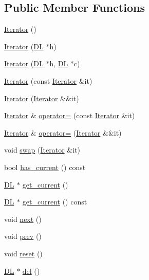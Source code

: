 \subsection*{Public Member Functions}
\begin{DoxyCompactItemize}
\item 
\hyperlink{class_designar_1_1_d_l_1_1_iterator_ac8115296dde1a00604510beba6707b36}{Iterator} ()
\item 
\hyperlink{class_designar_1_1_d_l_1_1_iterator_ab40eab4206926dca72f7981c4920c984}{Iterator} (\hyperlink{class_designar_1_1_d_l}{DL} $\ast$h)
\item 
\hyperlink{class_designar_1_1_d_l_1_1_iterator_aa90c0222a2141efc64f6b70b83137531}{Iterator} (\hyperlink{class_designar_1_1_d_l}{DL} $\ast$h, \hyperlink{class_designar_1_1_d_l}{DL} $\ast$c)
\item 
\hyperlink{class_designar_1_1_d_l_1_1_iterator_a6216eca5f9c0a153ac194a8b7c741636}{Iterator} (const \hyperlink{class_designar_1_1_d_l_1_1_iterator}{Iterator} \&it)
\item 
\hyperlink{class_designar_1_1_d_l_1_1_iterator_ae5d00988114ca7cb890fb5e887c5e3ba}{Iterator} (\hyperlink{class_designar_1_1_d_l_1_1_iterator}{Iterator} \&\&it)
\item 
\hyperlink{class_designar_1_1_d_l_1_1_iterator}{Iterator} \& \hyperlink{class_designar_1_1_d_l_1_1_iterator_a24c29185e86ef76e7ecb17e9abfd42a9}{operator=} (const \hyperlink{class_designar_1_1_d_l_1_1_iterator}{Iterator} \&it)
\item 
\hyperlink{class_designar_1_1_d_l_1_1_iterator}{Iterator} \& \hyperlink{class_designar_1_1_d_l_1_1_iterator_a927bb8ad074ad3021a2d92abfff06fac}{operator=} (\hyperlink{class_designar_1_1_d_l_1_1_iterator}{Iterator} \&\&it)
\item 
void \hyperlink{class_designar_1_1_d_l_1_1_iterator_af8bba1d661f8d6300664481d7c6fd976}{swap} (\hyperlink{class_designar_1_1_d_l_1_1_iterator}{Iterator} \&it)
\item 
bool \hyperlink{class_designar_1_1_d_l_1_1_iterator_a02ccb7a5bbdc828ed8ac923f383661d4}{has\+\_\+current} () const
\item 
\hyperlink{class_designar_1_1_d_l}{DL} $\ast$ \hyperlink{class_designar_1_1_d_l_1_1_iterator_a291e44d1aee5859059aed9754a3dd35a}{get\+\_\+current} ()
\item 
\hyperlink{class_designar_1_1_d_l}{DL} $\ast$ \hyperlink{class_designar_1_1_d_l_1_1_iterator_aab4752b8c8f25cfbbd3560cebf23b7d1}{get\+\_\+current} () const
\item 
void \hyperlink{class_designar_1_1_d_l_1_1_iterator_ade01f6f8d747962c895e95fc0e26c515}{next} ()
\item 
void \hyperlink{class_designar_1_1_d_l_1_1_iterator_a8550a08d7c7645c8ec41ba209ee21893}{prev} ()
\item 
void \hyperlink{class_designar_1_1_d_l_1_1_iterator_a7708230beaa8a47d664878d37c11bbd3}{reset} ()
\item 
\hyperlink{class_designar_1_1_d_l}{DL} $\ast$ \hyperlink{class_designar_1_1_d_l_1_1_iterator_aa21843f313121866b1ad1571c77e65c6}{del} ()
\end{DoxyCompactItemize}
